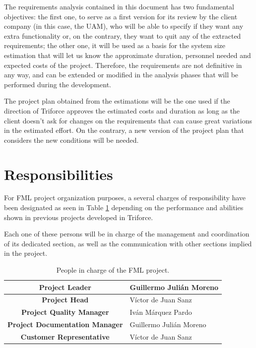 \documentclass[11pt]{report}
\begin{document}
The requirements analysis contained in this document has two fundamental objectives: the first one, to serve as a first version for its review by the client company (in this case, the UAM), who will be able to specify if they want any extra functionality or, on the contrary, they want to quit any of the extracted requirements; the other one, it will be used as a basis for the system size estimation that will let us know the approximate duration, personnel needed and expected costs of the project. Therefore, the requirements are not definitive in any way, and can be extended or modified in the analysis phases that will be performed during the development.

The project plan obtained from the estimations will be the one used if the direction of Triforce approves the estimated costs and duration as long as the client doesn't ask for changes on the requirements that can cause great variations in the estimated effort. On the contrary, a new version of the project plan that considers the new conditions will be needed.

\section{Responsibilities}

For FML project organization purposes, a several charges of responsibility have been designated as seen in Table \ref{tbl_Responsibilities} depending on the performance and abilities shown in previous projects developed in Triforce.

Each one of these persons will be in charge of the management and coordination of its dedicated section, as well as the communication with other sections implied in the project.


\begin{table}[hbtp]
\centering
\begin{tabular}{|c|p{5cm}|} \hline
\textbf{Project Leader} & Guillermo Julián Moreno \\ \hline
\textbf{Project Head} & Víctor de Juan Sanz \\ \hline
\textbf{Project Quality Manager} & Iván Márquez Pardo \\ \hline
\textbf{Project Documentation Manager} & Guillermo Julián Moreno \\ \hline
\textbf{Customer Representative} & Víctor de Juan Sanz \\ \hline
\end{tabular}
\caption{People in charge of the FML project.}
\label{tbl_Responsibilities}
\end{table}
\end{document}
